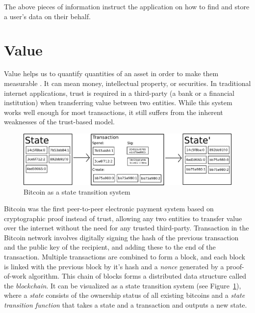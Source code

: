 		The above pieces of information instruct the application on how to find and store a user's data on their behalf.

\cleardoublepage
\section{Value}
	Value helps us to quantify quantities of an asset in order to make them measurable \cite{medium:iov:1}. It can mean money, intellectual property, or securities. In traditional internet applications, trust is required in a third-party (a bank or a financial institution) when transferring value between two entities. While this system works well enough for most transactions, it still suffers from the inherent weaknesses of the trust-based model\cite{nakamoto2008bitcoin}.
	
	\begin{figure}[h]
		\includegraphics[width=\linewidth]{figures/state-transition}
		\caption{\label{fig:state-transition} Bitcoin as a state transition system\protect\footnotemark}
	\end{figure}
	
	Bitcoin\cite{nakamoto2008bitcoin} was the first peer-to-peer electronic payment system based on cryptographic proof instead of trust, allowing any two entities to transfer value over the internet without the need for any trusted third-party. Transaction in the Bitcoin network involves digitally signing the hash of the previous transaction and the public key of the recipient, and adding these to the end of the transaction. Multiple transactions are combined to form a block, and each block is linked with the previous block by it's hash and a \textit{nonce} generated by a proof-of-work\cite{back2002hashcash} algorithm. This chain of blocks forms a distributed data structure called the \textit{blockchain}. It can be visualized as a state transition system (see Figure~\ref{fig:state-transition}), where a \textit{state} consists of the ownership status of all existing bitcoins and a \textit{state transition function} that takes a state and a transaction and outputs a new state\cite{buterin2014ethereum}.
	
